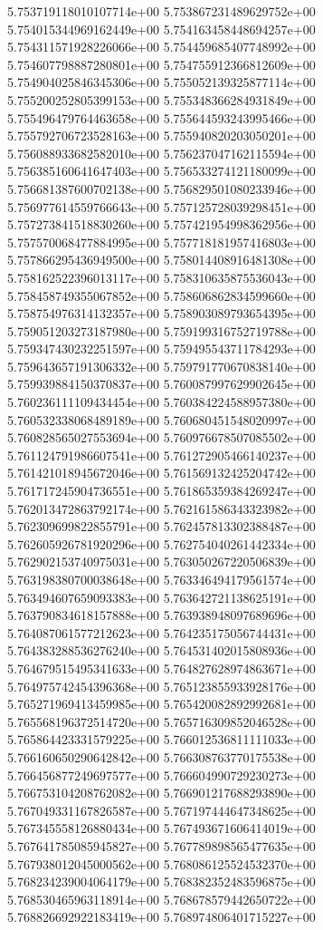 5.753719118010107714e+00
5.753867231489629752e+00
5.754015344969162449e+00
5.754163458448694257e+00
5.754311571928226066e+00
5.754459685407748992e+00
5.754607798887280801e+00
5.754755912366812609e+00
5.754904025846345306e+00
5.755052139325877114e+00
5.755200252805399153e+00
5.755348366284931849e+00
5.755496479764463658e+00
5.755644593243995466e+00
5.755792706723528163e+00
5.755940820203050201e+00
5.756088933682582010e+00
5.756237047162115594e+00
5.756385160641647403e+00
5.756533274121180099e+00
5.756681387600702138e+00
5.756829501080233946e+00
5.756977614559766643e+00
5.757125728039298451e+00
5.757273841518830260e+00
5.757421954998362956e+00
5.757570068477884995e+00
5.757718181957416803e+00
5.757866295436949500e+00
5.758014408916481308e+00
5.758162522396013117e+00
5.758310635875536043e+00
5.758458749355067852e+00
5.758606862834599660e+00
5.758754976314132357e+00
5.758903089793654395e+00
5.759051203273187980e+00
5.759199316752719788e+00
5.759347430232251597e+00
5.759495543711784293e+00
5.759643657191306332e+00
5.759791770670838140e+00
5.759939884150370837e+00
5.760087997629902645e+00
5.760236111109434454e+00
5.760384224588957380e+00
5.760532338068489189e+00
5.760680451548020997e+00
5.760828565027553694e+00
5.760976678507085502e+00
5.761124791986607541e+00
5.761272905466140237e+00
5.761421018945672046e+00
5.761569132425204742e+00
5.761717245904736551e+00
5.761865359384269247e+00
5.762013472863792174e+00
5.762161586343323982e+00
5.762309699822855791e+00
5.762457813302388487e+00
5.762605926781920296e+00
5.762754040261442334e+00
5.762902153740975031e+00
5.763050267220506839e+00
5.763198380700038648e+00
5.763346494179561574e+00
5.763494607659093383e+00
5.763642721138625191e+00
5.763790834618157888e+00
5.763938948097689696e+00
5.764087061577212623e+00
5.764235175056744431e+00
5.764383288536276240e+00
5.764531402015808936e+00
5.764679515495341633e+00
5.764827628974863671e+00
5.764975742454396368e+00
5.765123855933928176e+00
5.765271969413459985e+00
5.765420082892992681e+00
5.765568196372514720e+00
5.765716309852046528e+00
5.765864423331579225e+00
5.766012536811111033e+00
5.766160650290642842e+00
5.766308763770175538e+00
5.766456877249697577e+00
5.766604990729230273e+00
5.766753104208762082e+00
5.766901217688293890e+00
5.767049331167826587e+00
5.767197444647348625e+00
5.767345558126880434e+00
5.767493671606414019e+00
5.767641785085945827e+00
5.767789898565477635e+00
5.767938012045000562e+00
5.768086125524532370e+00
5.768234239004064179e+00
5.768382352483596875e+00
5.768530465963118914e+00
5.768678579442650722e+00
5.768826692922183419e+00
5.768974806401715227e+00
